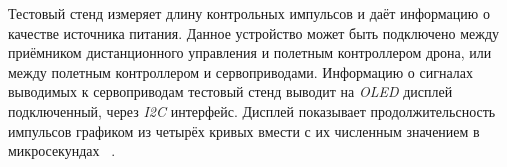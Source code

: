 Тестовый стенд измеряет длину контрольных импульсов и даёт информацию о качестве источника питания.
Данное устройство может быть подключено между приёмником дистанционного управления и полетным контроллером дрона,
или между полетным контроллером и сервоприводами.
Информацию о сигналах выводимых к сервоприводам тестовый стенд выводит на \textit{OLED} дисплей подключенный, через \textit{I2C} интерфейс.
Дисплей показывает продолжительсность импульсов графиком из четырёх кривых вмести с их численным значением в микросекундах ~\cite{Elector521}.